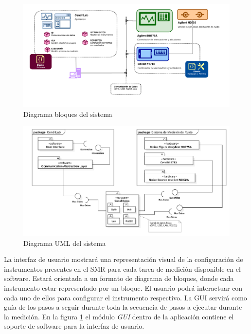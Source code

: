 \documentclass[paper=a4,oneside,fontsize=12pt]{article}
\newcommand{\SMR}{SMR\xspace}
\begin{document}
	\begin{figure}[H]
		\centering
		\includegraphics[width=15cm]{Imagenes/SystemMainDiagram.pdf}
		\caption{Diagrama bloques del sistema}
		\label{Fig:SystemMainDiagram}
	\end{figure}

	\begin{figure}[H]
		\centering 
		\includegraphics[width=15cm]{Imagenes/MainSystemPackagesUML.pdf}
		\caption{Diagrama UML del sistema}
		\label{Fig:MainSystemPackagesUML}
 	\end{figure}
 
 	La interfaz de usuario mostrará una representación visual de la configuración de instrumentos presentes en el \SMR para cada tarea de medición disponible en el software. Estará orientada a un formato de diagrama de bloques, donde cada instrumento estar representado por un bloque. El usuario podrá interactuar con cada uno de ellos para configurar el instrumento respectivo. La GUI servirá como guía de los pasos a seguir durante toda la secuencia de pasos a ejecutar durante la medición. En la figura \ref{Fig:SystemMainDiagram} el módulo \emph{GUI} dentro de la aplicación contiene el soporte de software para la interfaz de usuario.
 	
\end{document}
